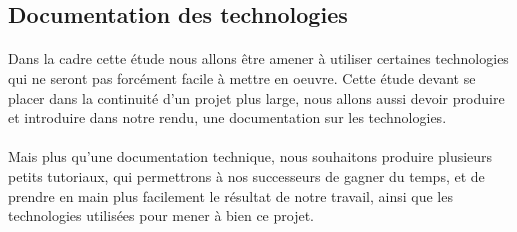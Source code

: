 \subsection{Documentation des technologies}
\paragraph{} Dans la cadre cette étude nous allons être amener à utiliser certaines technologies qui ne seront pas forcément facile à mettre en oeuvre. Cette étude devant se placer dans la continuité d'un projet plus large, nous allons aussi devoir produire et introduire dans notre rendu, une documentation sur les technologies.\\\\\indent
Mais plus qu'une documentation technique, nous souhaitons produire plusieurs petits tutoriaux, qui permettrons à nos successeurs de gagner du temps, et de prendre en main plus facilement le résultat de notre travail, ainsi que les technologies utilisées pour mener à bien ce projet.
\newpage